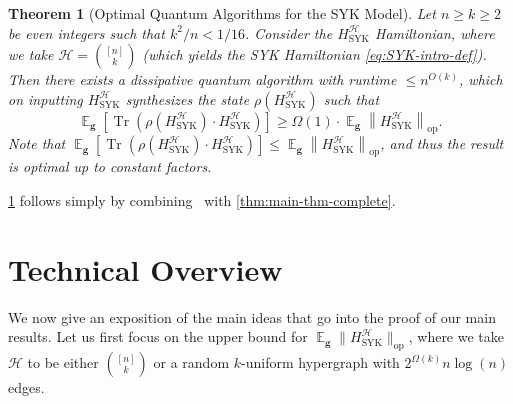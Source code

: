 \documentclass
[11pt,letterpaper]
{article}
\newtheorem{theorem}{Theorem}[section]
\theoremstyle{definition}
\newcommand{\Tr}{\operatorname{Tr}}
\newcommand{\1}{\mathbf{1}}
\newcommand{\cH}{\mathcal H}
\DeclareMathOperator*{\E}{\mathbb{E}}
\renewcommand{\geq}{\geqslant}
\renewcommand{\leq}{\leqslant}
\begin{document}
\begin{theorem}[Optimal Quantum Algorithms for the SYK Model]\label{thm:optimal-qalg-syk}
    Let $n\geq k\geq 2$ be even integers such that $k^2/n < 1/16$. Consider the $H^\cH_{\operatorname{SYK}}$ Hamiltonian, where we take $\cH = \binom{[n]}{k}$ (which yields the SYK Hamiltonian \eqref{eq:SYK-intro-def}). Then there exists a dissipative quantum algorithm with runtime $\leq n^{O(k)}$, which on inputting $H^\cH_{\operatorname{SYK}}$ synthesizes the state $\rho(H^\cH_{\operatorname{SYK}})$ such that 
    \begin{equation}\label{eq:optimal-ground-state}
        \E_{\bm g}\left[\Tr(\rho(H^\cH_{\operatorname{SYK}})\cdot H^\cH_{\operatorname{SYK}})\right]\geq\Omega(1)\cdot\E_{\bm g}\left\| H^\cH_{\operatorname{SYK}}\right\|_{\operatorname{op}}.
    \end{equation}
    Note that $\E_{\bm g}\left[\Tr(\rho(H^\cH_{\operatorname{SYK}})\cdot H^\cH_{\operatorname{SYK}})\right]\leq\E_{\bm g}\left\| H^\cH_{\operatorname{SYK}}\right\|_{\operatorname{op}}$, and thus the result is optimal up to constant factors. 
\end{theorem}

\cref{thm:optimal-qalg-syk} follows simply by combining~\cite[Theorem~3.1]{basso2024optimizing} with \cref{thm:main-thm-complete}.

\section{Technical Overview}\label{sec:overview}
We now give an exposition of the main ideas that go into the proof of our main results. Let us first focus on the upper bound for $\E_{\bm g}\|H^\cH_{\operatorname{SYK}}\|_{\operatorname{op}}$, where we take $\cH$ to be either $\binom{[n]}{k}$ or a random $k$-uniform hypergraph with $2^{\Omega(k)}n\log(n)$ edges. 
\end{document}
